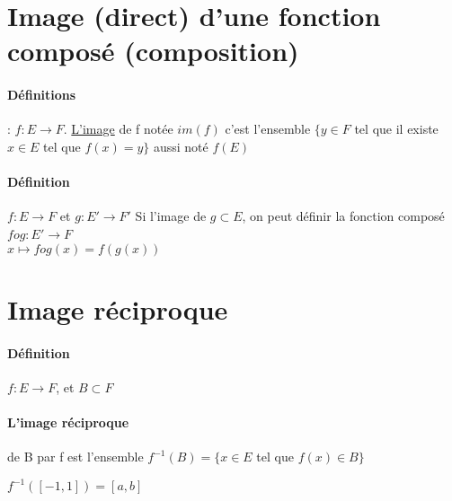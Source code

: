 \section{Image (direct) d'une fonction composé (composition)}
\paragraph{Définitions} : $f:E \rightarrow F$. \ul{L'image} de f notée $im(f)$ c'est l'ensemble $\{y \in F$ tel que il existe $x \in E$ tel que $f(x) = y\}$ aussi noté $f(E)$

\paragraph{Définition} $f:E \rightarrow F$ et $g:E' \rightarrow F'$
Si l'image de $g \subset E$, on peut définir la fonction composé $f o g : E' \rightarrow F$ 
~\\
$x \mapsto f o g (x) = f(g(x))$

\section{Image réciproque} 
\paragraph{Définition} $f:E \rightarrow F$, et $B \subset F$
\paragraph{L'image réciproque} de B par f est l'ensemble  $f^{-1}(B) = \{x \in E$ tel que $f(x) \in B\}$

$f^{-1}([-1, 1]) = [a, b]$
